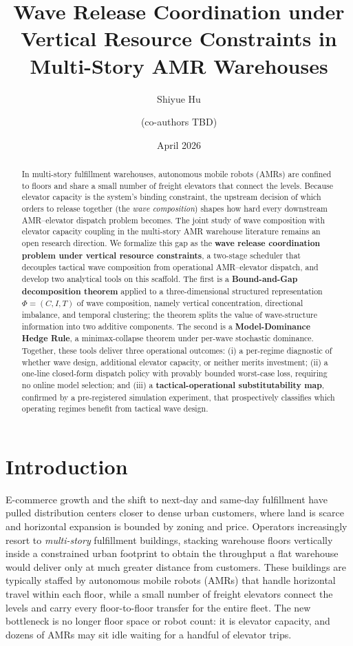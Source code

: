 \documentclass[11pt, a4paper]{article}
\title{Wave Release Coordination under Vertical Resource Constraints in Multi-Story AMR Warehouses}
\author{Shiyue Hu \and (co-authors TBD)}
\date{April 2026}
\begin{document}
\maketitle

\begin{abstract}
In multi-story fulfillment warehouses, autonomous mobile robots (AMRs) are confined to floors and share a small number of freight elevators that connect the levels. Because elevator capacity is the system's binding constraint, the upstream decision of which orders to release together (the \emph{wave composition}) shapes how hard every downstream AMR--elevator dispatch problem becomes. The joint study of wave composition with elevator capacity coupling in the multi-story AMR warehouse literature remains an open research direction. We formalize this gap as the \textbf{wave release coordination problem under vertical resource constraints}, a two-stage scheduler that decouples tactical wave composition from operational AMR--elevator dispatch, and develop two analytical tools on this scaffold. The first is a \textbf{Bound-and-Gap decomposition theorem} applied to a three-dimensional structured representation $\Phi = (C, I, T)$ of wave composition, namely vertical concentration, directional imbalance, and temporal clustering; the theorem splits the value of wave-structure information into two additive components. The second is a \textbf{Model-Dominance Hedge Rule}, a minimax-collapse theorem under per-wave stochastic dominance. Together, these tools deliver three operational outcomes: (i) a per-regime diagnostic of whether wave design, additional elevator capacity, or neither merits investment; (ii) a one-line closed-form dispatch policy with provably bounded worst-case loss, requiring no online model selection; and (iii) a \textbf{tactical-operational substitutability map}, confirmed by a pre-registered simulation experiment, that prospectively classifies which operating regimes benefit from tactical wave design.
\end{abstract}

\section{Introduction}

E-commerce growth and the shift to next-day and same-day fulfillment have pulled distribution centers closer to dense urban customers, where land is scarce and horizontal expansion is bounded by zoning and price. Operators increasingly resort to \emph{multi-story} fulfillment buildings, stacking warehouse floors vertically inside a constrained urban footprint to obtain the throughput a flat warehouse would deliver only at much greater distance from customers. These buildings are typically staffed by autonomous mobile robots (AMRs) that handle horizontal travel within each floor, while a small number of freight elevators connect the levels and carry every floor-to-floor transfer for the entire fleet. The new bottleneck is no longer floor space or robot count: it is elevator capacity, and dozens of AMRs may sit idle waiting for a handful of elevator trips.
\end{document}
